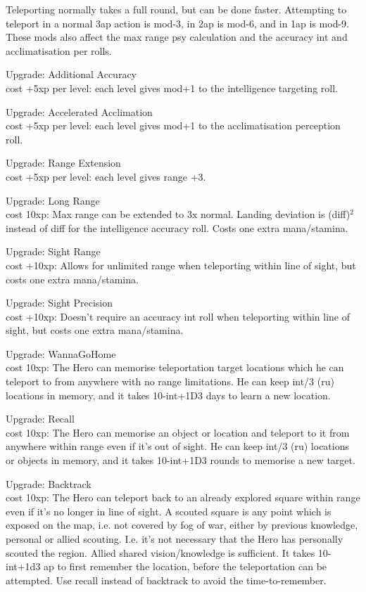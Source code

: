 Teleporting normally takes a full round, but can be done faster. Attempting to teleport in a normal 3ap action is mod-3, in 2ap is mod-6, and in 1ap is mod-9. These mods also affect the max range psy calculation and the accuracy int and acclimatisation per rolls.

Upgrade: Additional Accuracy\\
cost +5xp per level: each level gives mod+1 to the intelligence targeting roll.

Upgrade: Accelerated Acclimation\\
cost +5xp per level: each level gives mod+1 to the acclimatisation perception roll.

Upgrade: Range Extension\\
cost +5xp per level: each level gives range +3.

Upgrade: Long Range\\
cost 10xp: Max range can be extended to 3x normal. Landing deviation is (diff)$^2$ instead of diff for the intelligence accuracy roll. Costs one extra mana/stamina.

Upgrade: Sight Range\\
cost +10xp: Allows for unlimited range when teleporting within line of sight, but costs one extra mana/stamina.

Upgrade: Sight Precision\\
cost +10xp: Doesn't require an accuracy int roll when teleporting within line of sight, but costs one extra mana/stamina.

Upgrade: WannaGoHome\\
cost 10xp: The Hero can memorise teleportation target locations which he can teleport to from anywhere with no range limitations. He can keep int/3 (ru) locations in memory, and it takes 10-int+1D3 days to learn a new location.

Upgrade: Recall\\
cost 10xp: The Hero can memorise an object or location and teleport to it from anywhere within range even if it's out of sight. He can keep int/3 (ru) locations or objects in memory, and it takes 10-int+1D3 rounds to memorise a new target.

Upgrade: Backtrack\\
cost 10xp: The Hero can teleport back to an already explored square within range even if it's no longer in line of sight. A scouted square is any point which is exposed on the map, i.e. not covered by fog of war, either by previous knowledge, personal or allied scouting. I.e. it's not necessary that the Hero has personally scouted the region. Allied shared vision/knowledge is sufficient. It takes 10-int+1d3 ap to first remember the location, before the teleportation can be attempted. Use recall instead of backtrack to avoid the time-to-remember.

